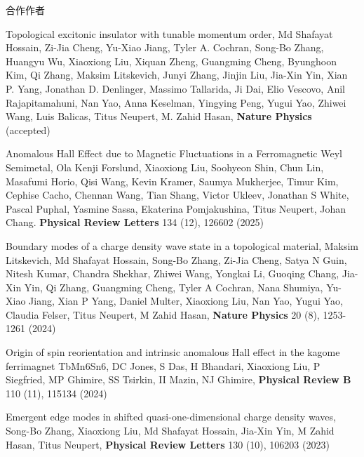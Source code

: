 \documentclass[11pt,a4paper,sans]{moderncv} %
\begin{document}
合作作者
\begin{etaremune} 
 
  \item Topological excitonic insulator with tunable momentum order, Md Shafayat Hossain, Zi-Jia Cheng, Yu-Xiao Jiang, Tyler A. Cochran, Song-Bo Zhang, Huangyu Wu, \textcolor{cvblue}{Xiaoxiong Liu}, Xiquan Zheng, Guangming Cheng, Byunghoon Kim, Qi Zhang, Maksim Litskevich, Junyi Zhang, Jinjin Liu, Jia-Xin Yin, Xian P. Yang, Jonathan D. Denlinger, Massimo Tallarida, Ji Dai, Elio Vescovo, Anil Rajapitamahuni, Nan Yao, Anna Keselman, Yingying Peng, Yugui Yao, Zhiwei Wang, Luis Balicas, Titus Neupert, M. Zahid Hasan, \textbf{Nature Physics}  (accepted)
  
  \item Anomalous Hall Effect due to Magnetic Fluctuations in a Ferromagnetic Weyl Semimetal, Ola Kenji Forslund, \textcolor{cvblue}{Xiaoxiong Liu}, Soohyeon Shin, Chun Lin, Masafumi Horio, Qisi Wang, Kevin Kramer, Saumya Mukherjee, Timur Kim, Cephise Cacho, Chennan Wang, Tian Shang, Victor Ukleev, Jonathan S White, Pascal Puphal, Yasmine Sassa, Ekaterina Pomjakushina, Titus Neupert, Johan Chang. \textbf{Physical Review Letters} 134 (12), 126602 (2025)
  
  \item Boundary modes of a charge density wave state in a topological material, Maksim Litskevich, Md Shafayat Hossain, Song-Bo Zhang, Zi-Jia Cheng, Satya N Guin, Nitesh Kumar, Chandra Shekhar, Zhiwei Wang, Yongkai Li, Guoqing Chang, Jia-Xin Yin, Qi Zhang, Guangming Cheng, Tyler A Cochran, Nana Shumiya, Yu-Xiao Jiang, Xian P Yang, Daniel Multer,  \textcolor{cvblue}{Xiaoxiong Liu}, Nan Yao, Yugui Yao, Claudia Felser, Titus Neupert, M Zahid Hasan, \textbf{Nature Physics} 20 (8), 1253-1261 (2024)
  
  \item Origin of spin reorientation and intrinsic anomalous Hall effect in the kagome ferrimagnet TbMn6Sn6, DC Jones, S Das, H Bhandari, \textcolor{cvblue}{Xiaoxiong Liu}, P Siegfried, MP Ghimire, SS Tsirkin, II Mazin, NJ Ghimire, \textbf{Physical Review B} 110 (11), 115134 (2024)
  
  \item Emergent edge modes in shifted quasi-one-dimensional charge density waves, Song-Bo Zhang,  \textcolor{cvblue}{Xiaoxiong Liu}, Md Shafayat Hossain, Jia-Xin Yin, M Zahid Hasan, Titus Neupert, \textbf{Physical Review Letters} 130 (10), 106203 (2023)
  


\end{etaremune}
\end{document}
